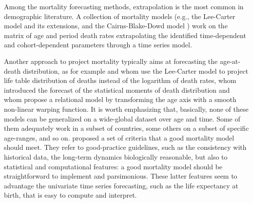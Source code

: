 \documentclass[a4,11pt]{article}
\begin{document}

Among the mortality forecasting methods, extrapolation is the most common in demographic literature. A collection of mortality models (e.g., the Lee-Carter model \citep{LC1992} and its extensions, and the Cairns-Blake-Dowd model \citep{CBD2006}) work on the matrix of age and period death rates extrapolating the identified time-dependent and cohort-dependent parameters through a time series model.

Another approach to project mortality typically aims at forecasting the age-at-death distribution, as for example \cite{Oeppen08} and \cite{Bergeron} whom use the Lee-Carter model to project life table distribution of deaths instead of the logarithm of death rates, \cite{Pascariu19} whom introduced the forecast of the statistical moments of death distribution and \cite{BaselliniCamarda} whom propose a relational model by transforming the age axis with a smooth non-linear warping function. It is worth emphasizing that, basically, none of these models can be generalized on a wide-global dataset over age and time. Some of them adequately work in a subset of countries, some others on a subset of specific age-ranges, and so on. \cite{Cairns} proposed a set of criteria that a good mortality model should meet. They refer to good-practice guidelines, such as the consistency with historical data, the long-term dynamics biologically reasonable, but also to statistical and computational features: a good mortality model should be straightforward to implement and parsimonious. These latter features seem to advantage the univariate time series forecasting, such as the life expectancy at birth, that is easy to compute and interpret.
\end{document}
